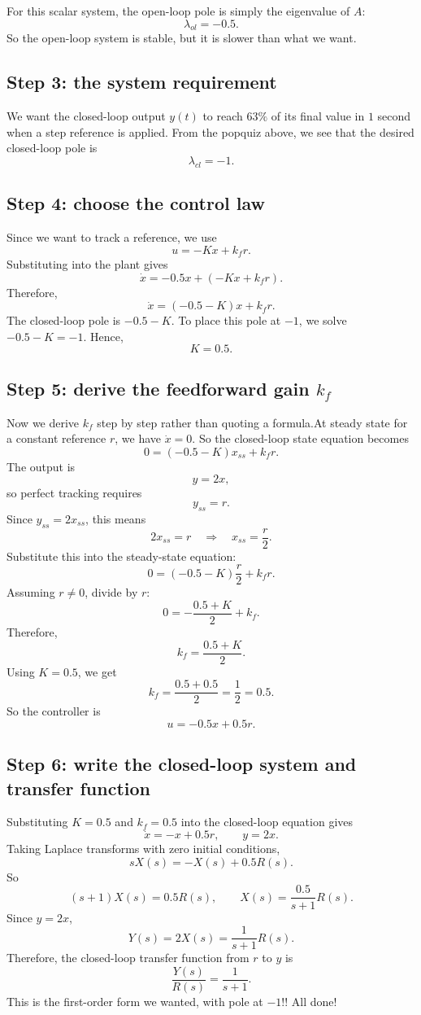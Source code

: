 \documentclass{ee122_notes}
\begin{document}
For this scalar system, the open-loop pole is simply the eigenvalue of \(A\):
\[
\lambda_{ol}=-0.5.
\]
So the open-loop system is stable, but it is slower than what we want.

\subsection*{Step 3: the system requirement}

We want the closed-loop output \(y(t)\) to reach \(63\%\) of its final value in \(1\) second when a step reference is applied. From the popquiz above, we see that the desired closed-loop pole is
\[
\lambda_{cl}=-1.
\]

\subsection*{Step 4: choose the control law}

Since we want to track a reference, we use
\[
u=-Kx+k_f r.
\]
Substituting into the plant gives
\[
\dot{x}=-0.5x+\left(-Kx+k_f r\right).
\]
Therefore,
\[
\dot{x}=(-0.5-K)x+k_f r.
\]
The closed-loop pole is
\(
-0.5-K.
\)
To place this pole at \(-1\), we solve
\(
-0.5-K=-1.
\)
Hence,
\[
K=0.5.
\]

\subsection*{Step 5: derive the feedforward gain $k_f$}

Now we derive \(k_f\) step by step rather than quoting a formula.At steady state for a constant reference \(r\), we have
\(
\dot{x}=0.
\)
So the closed-loop state equation becomes
\[
0=(-0.5-K)x_{ss}+k_f r.
\]
The output is
\[
y=2x,
\]
so perfect tracking requires
\[
y_{ss}=r.
\]
Since \(y_{ss}=2x_{ss}\), this means
\[
2x_{ss}=r
\quad\Longrightarrow\quad
x_{ss}=\frac{r}{2}.
\]
Substitute this into the steady-state equation:
\[
0=(-0.5-K)\frac{r}{2}+k_f r.
\]
Assuming \(r\neq 0\), divide by \(r\):
\[
0=-\frac{0.5+K}{2}+k_f.
\]
Therefore,
\[
k_f=\frac{0.5+K}{2}.
\]
Using \(K=0.5\), we get
\[
k_f=\frac{0.5+0.5}{2}=\frac{1}{2}=0.5.
\]
So the controller is
\[
u=-0.5x+0.5r.
\]

\subsection*{Step 6: write the closed-loop system and transfer function}

Substituting \(K=0.5\) and \(k_f=0.5\) into the closed-loop equation gives
\[
\dot{x}=-x+0.5r,
\qquad
y=2x.
\]
Taking Laplace transforms with zero initial conditions,
\[
sX(s)=-X(s)+0.5R(s).
\]
So
\[
(s+1)X(s)=0.5R(s),
\qquad
X(s)=\frac{0.5}{s+1}R(s).
\]
Since \(y=2x\),
\[
Y(s)=2X(s)=\frac{1}{s+1}R(s).
\]
Therefore, the closed-loop transfer function from \(r\) to \(y\) is
\[
\frac{Y(s)}{R(s)}=\frac{1}{s+1}.
\]
This is the first-order form we wanted, with pole at \(-1\)!! All done!
\end{document}
